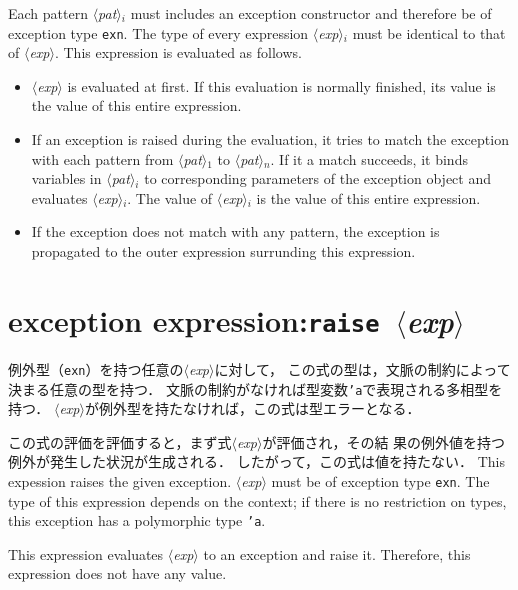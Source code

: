 \documentclass{jbook}
\newcommand{\txt}[2]{#2}
\newcommand{\code}[1]{\mbox{\large\tt #1}}
\newcommand{\nonterm}[1]{\mbox{$\langle$}{\it #1}\mbox{$\rangle$}}
\newcommand{\term}[1]{\mbox{{\tt #1}}}
\begin{document}
	Each pattern \nonterm{pat}$_i$ must includes an exception
constructor and therefore be of exception type \code{exn}.
	The type of every expression \nonterm{exp}$_i$ must be
identical to that of \nonterm{exp}.
	This expression is evaluated as follows.
\begin{itemize}
\item \nonterm{exp} is evaluated at first.
	If this evaluation is normally finished,
its value is the value of this entire expression.
\item If an exception is raised during the evaluation,
it tries to match the exception with each pattern from
\nonterm{pat}$_1$ to \nonterm{pat}$_n$.
	If it a match succeeds, it binds variables
in \nonterm{pat}$_i$ to corresponding parameters of the exception
object and evaluates \nonterm{exp}$_i$.
	The value of \nonterm{exp}$_i$ is the value of this entire
expression.
\item If the exception does not match with any pattern,
the exception is propagated to the outer expression surrunding
this expression.
\end{itemize}	
\fi%

\section{\txt{例外発生式}{exception expression}:\term{raise}\ \nonterm{exp}}
\label{sec:expression:raise}

\ifjp%
	例外型（\code{exn}）を持つ任意の\nonterm{exp}に対して，
この式の型は，文脈の制約によって決まる任意の型を持つ．
	文脈の制約がなければ型変数\code{'a}で表現される多相型を持つ．
	\nonterm{exp}が例外型を持たなければ，この式は型エラーとなる．

	この式の評価を評価すると，まず式\nonterm{exp}が評価され，その結
果の例外値を持つ例外が発生した状況が生成される．
	したがって，この式は値を持たない．
\else%
	This expession raises the given exception.
        \nonterm{exp} must be of exception type \code{exn}.
	The type of this expression depends on the context;
if there is no restriction on types,
this exception has a polymorphic type \code{'a}.

	This expression evaluates \nonterm{exp} to an exception
and raise it.
	Therefore, this expression does not have any value.
\fi%
\end{document}
